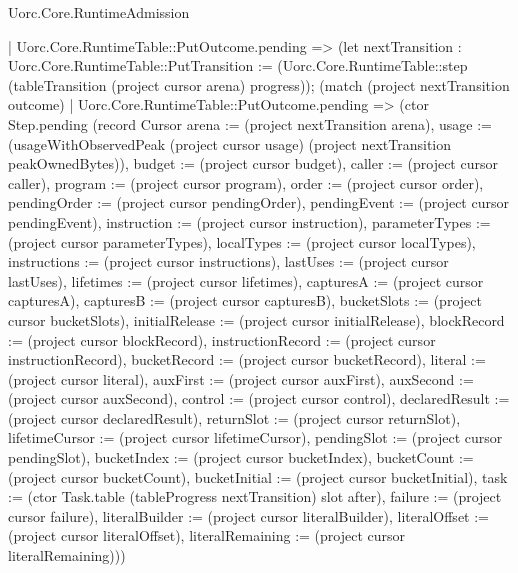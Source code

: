 \begin{lexlean}{Uorc.Core.RuntimeAdmission}
\begin{semanticmodule}
{      | Uorc.Core.RuntimeTable::PutOutcome.pending => (let nextTransition : Uorc.Core.RuntimeTable::PutTransition := (Uorc.Core.RuntimeTable::step (tableTransition (project cursor arena) progress)); (match (project nextTransition outcome)
        | Uorc.Core.RuntimeTable::PutOutcome.pending => (ctor Step.pending (record Cursor {arena := (project nextTransition arena), usage := (usageWithObservedPeak (project cursor usage) (project nextTransition peakOwnedBytes)), budget := (project cursor budget), caller := (project cursor caller), program := (project cursor program), order := (project cursor order), pendingOrder := (project cursor pendingOrder), pendingEvent := (project cursor pendingEvent), instruction := (project cursor instruction), parameterTypes := (project cursor parameterTypes), localTypes := (project cursor localTypes), instructions := (project cursor instructions), lastUses := (project cursor lastUses), lifetimes := (project cursor lifetimes), capturesA := (project cursor capturesA), capturesB := (project cursor capturesB), bucketSlots := (project cursor bucketSlots), initialRelease := (project cursor initialRelease), blockRecord := (project cursor blockRecord), instructionRecord := (project cursor instructionRecord), bucketRecord := (project cursor bucketRecord), literal := (project cursor literal), auxFirst := (project cursor auxFirst), auxSecond := (project cursor auxSecond), control := (project cursor control), declaredResult := (project cursor declaredResult), returnSlot := (project cursor returnSlot), lifetimeCursor := (project cursor lifetimeCursor), pendingSlot := (project cursor pendingSlot), bucketIndex := (project cursor bucketIndex), bucketCount := (project cursor bucketCount), bucketInitial := (project cursor bucketInitial), task := (ctor Task.table (tableProgress nextTransition) slot after), failure := (project cursor failure), literalBuilder := (project cursor literalBuilder), literalOffset := (project cursor literalOffset), literalRemaining := (project cursor literalRemaining)}))
}
\end{semanticmodule}
\end{lexlean}
